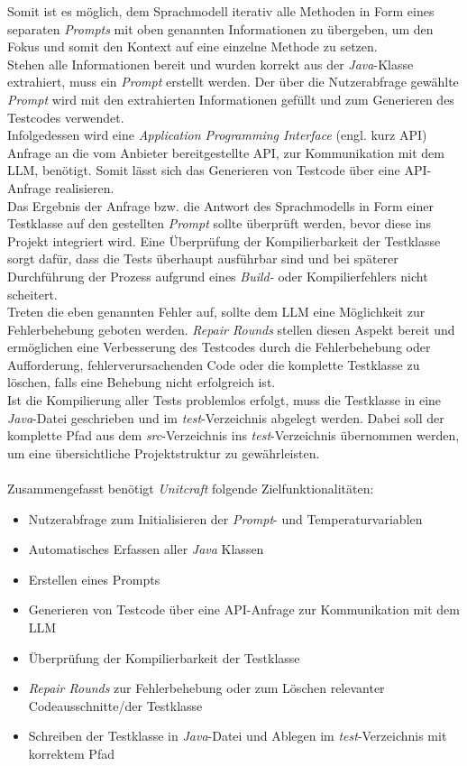 Somit ist es möglich, dem Sprachmodell iterativ alle Methoden in Form eines separaten \textit{Prompts} mit oben genannten Informationen zu übergeben, um den Fokus und somit den Kontext auf eine einzelne Methode zu setzen. \\ Stehen alle Informationen bereit und wurden korrekt aus der \textit{Java}-Klasse extrahiert, muss ein \textit{Prompt} erstellt werden. Der über die Nutzerabfrage gewählte \textit{Prompt} wird mit den extrahierten Informationen gefüllt und zum Generieren des Testcodes verwendet.\\ Infolgedessen wird eine \textit{Application Programming Interface} (engl. kurz API) Anfrage an die vom Anbieter bereitgestellte \acs{API}, zur Kommunikation mit dem LLM, benötigt. Somit lässt sich das Generieren von Testcode über eine API-Anfrage realisieren.\\ Das Ergebnis der Anfrage bzw. die Antwort des Sprachmodells in Form einer Testklasse auf den gestellten \textit{Prompt} sollte überprüft werden, bevor diese ins Projekt integriert wird. Eine Überprüfung der Kompilierbarkeit der Testklasse sorgt dafür, dass die Tests überhaupt ausführbar sind und bei späterer Durchführung der Prozess aufgrund eines \textit{Build-} oder Kompilierfehlers nicht scheitert.\\ Treten die eben genannten Fehler auf, sollte dem LLM eine Möglichkeit zur Fehlerbehebung geboten werden. \textit{Repair Rounds} stellen diesen Aspekt bereit und ermöglichen eine Verbesserung des Testcodes durch die Fehlerbehebung oder Aufforderung, fehlerverursachenden Code oder die komplette Testklasse zu löschen, falls eine Behebung nicht erfolgreich ist. \\ Ist die Kompilierung aller Tests problemlos erfolgt, muss die Testklasse in eine \textit{Java}-Datei geschrieben und im \textit{test}-Verzeichnis abgelegt werden. Dabei soll der komplette Pfad aus dem \textit{src}-Verzeichnis ins \textit{test}-Verzeichnis übernommen werden, um eine übersichtliche Projektstruktur zu gewährleisten.\\\\Zusammengefasst benötigt \textit{Unitcraft} folgende Zielfunktionalitäten:
\begin{itemize}
    \setlength{\parskip}{1pt}
    \item Nutzerabfrage zum Initialisieren der \textit{Prompt}- und Temperaturvariablen
    \item Automatisches Erfassen aller \textit{Java} Klassen
    \item Erstellen eines Prompts
    \item Generieren von Testcode über eine API-Anfrage zur Kommunikation mit dem LLM
    \item Überprüfung der Kompilierbarkeit der Testklasse
    \item \textit{Repair Rounds} zur Fehlerbehebung oder zum Löschen relevanter Codeausschnitte/der Testklasse
    \item Schreiben der Testklasse in \textit{Java}-Datei und Ablegen im \textit{test}-Verzeichnis mit korrektem Pfad
\end{itemize}
